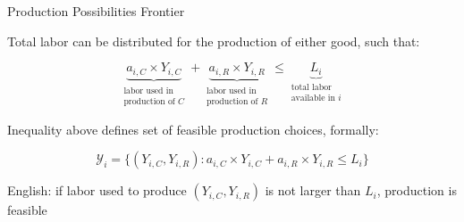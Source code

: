 \documentclass[notes,11pt, aspectratio=169, xcolor=table]{beamer}
\newenvironment{wideitemize}{\itemize\addtolength{\itemsep}{10pt}}{\enditemize}
\begin{document}
\begin{frame}{Production Possibilities Frontier}
\begin{wideitemize}
        \item Total labor can be distributed for the production of either good, such that:

        \begin{equation*}
            \underbrace{a_{i,C} \times Y_{i,C}}_{\substack{\text{labor used in} \\ \text{production of } C}} + \underbrace{a_{i,R} \times Y_{i,R}}_{\substack{\text{labor used in} \\ \text{production of } R}} \le \underbrace{L_i}_{\substack{\text{total labor} \\ \text{available in } i}}
        \end{equation*}

        \item<2-> Inequality above defines set of feasible production choices, formally:

        \begin{equation*}
            \mathcal{Y}_{i} = \{ (Y_{i,C}, Y_{i,R}) : a_{i,C} \times Y_{i,C} + a_{i,R} \times Y_{i,R} \le L_i \}
        \end{equation*}
        
        \item<2-> English: if labor used to produce $(Y_{i,C}, Y_{i,R})$ is not larger than $L_i$, production is feasible
    \end{wideitemize}
\end{frame}
\end{document}
